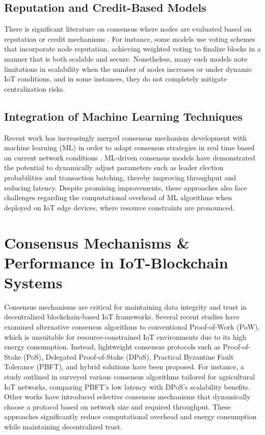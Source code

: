 \documentclass[12pt,onecolumn]{IEEEtran} %
\begin{document}
  \subsection{Reputation and Credit-Based Models}\label{subsec:consensus-rep}
There is significant literature on consensus where nodes are evaluated based on reputation or credit mechanisms \cite{morais2023surveyonintegration, khan2022asurveyand}. For instance, some models use voting schemes that incorporate node reputation, achieving weighted voting to finalize blocks in a manner that is both scalable and secure. Nonetheless, many such models note limitations in scalability when the number of nodes increases or under dynamic IoT conditions, and in some instances, they do not completely mitigate centralization risks.
  \subsection{Integration of Machine Learning Techniques}\label{subsec:consensus-ml}
Recent work has increasingly merged consensus mechanism development with machine learning (ML) in order to adapt consensus strategies in real time based on current network conditions \cite{alam2023anoverviewof, haque2024ascalableblockchain, guru2023asurveyon}. ML-driven consensus models have demonstrated the potential to dynamically adjust parameters such as leader election probabilities and transaction batching, thereby improving throughput and reducing latency. Despite promising improvements, these approaches also face challenges regarding the computational overhead of ML algorithms when deployed on IoT edge devices, where resource constraints are pronounced.

\section{Consensus Mechanisms \& Performance in IoT-Blockchain Systems}\label{sec:consensus-performance}
Consensus mechanisms are critical for maintaining data integrity and trust in decentralized blockchain-based IoT frameworks. Several recent studies have examined alternative consensus algorithms to conventional Proof-of-Work (PoW), which is unsuitable for resource-constrained IoT environments due to its high energy consumption. Instead, lightweight consensus protocols such as Proof-of-Stake (PoS), Delegated Proof-of-Stake (DPoS), Practical Byzantine Fault Tolerance (PBFT), and hybrid solutions have been proposed. For instance, a study outlined in \cite{ali2022blockchainenabledarchitecture} surveyed various consensus algorithms tailored for agricultural IoT networks, comparing PBFT's low latency with DPoS's scalability benefits. Other works \cite{morais2023surveyonintegration, khan2022ablockchainand} have introduced selective consensus mechanisms that dynamically choose a protocol based on network size and required throughput. These approaches significantly reduce computational overhead and energy consumption while maintaining decentralized trust.
\end{document}
